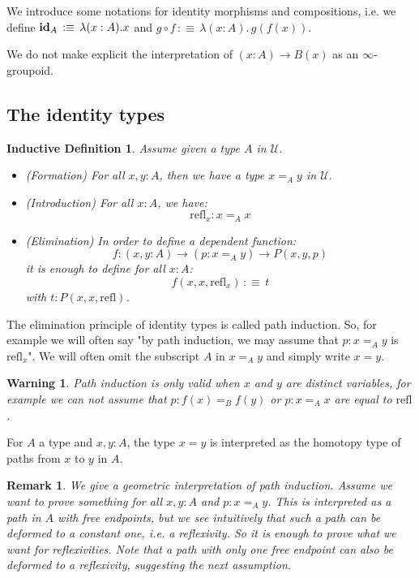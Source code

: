 \documentclass{article}
\newcommand{\sse}[1]{\medbreak \subsection{#1}}
\newcommand{\U}{{\mathcal U}}
\renewcommand{\r}{\rightarrow}
\newcommand{\Gl}{\lambda}
\newcommand{\refl}{\mathrm{refl}}
\newcommand{\id}{\mathrm{\bf id}}
\newtheorem{remark}{Remark}
\newtheorem{ind_def}{Inductive Definition}
\newtheorem{warning}{\danger Warning}
\begin{document}
We introduce some notations for identity morphisms and compositions, i.e. %
we define $\id_A \, :\equiv\, \Gl(x:A).x$ and $g\circ f\, :\equiv\, \Gl(x:A).\, g(f(x))$.

We do not make explicit the interpretation of $(x:A)\r B(x)$ as an $\infty$-groupoid.



\sse{The identity types}

\begin{ind_def}
Assume given a type $A$ in $\U$.%
\begin{itemize}
\item (Formation) For all $x,y:A$, then we have a type $x=_A y$ in $\U$.
\item (Introduction) For all $x:A$, we have:
\[\refl_x : x=_Ax\]
\item (Elimination) In order to define a dependent function: 
\[f : (x,y:A)\r (p:x=_Ay)\r P(x,y,p)\] 
it is enough to define for all $x:A$:
\[f(x,x,\refl_x)\,:\equiv\, t\]
with $t:P(x,x,\refl)$.

\end{itemize}
\end{ind_def}

The elimination principle of identity types is called path induction. So, for example we will often say "by path induction, we may assume that $p:x=_A y$ is $\refl_x$". We will often omit the subscript $A$ in $x=_Ay$ and simply write $x=y$. 

\begin{warning}
Path induction is only valid when $x$ and $y$ are distinct variables, for example we can not assume that $p:f(x)=_Bf(y)$ or $p:x=_Ax$ are equal to $\refl$.
\end{warning}

For $A$ a type and $x,y:A$, the type $x=y$ is interpreted as the homotopy type of paths from $x$ to $y$ in $A$.

\begin{remark}
We give a geometric interpretation of path induction. Assume we want to prove something for all $x,y:A$ and $p:x=_Ay$. This is interpreted as a path in $A$ with free endpoints, but we see intuitively that such a path can be deformed to a constant one, i.e. a reflexivity. So it is enough to prove what we want for reflexivities. Note that a path with only one free endpoint can also be deformed to a reflexivity, suggesting the next assumption.%
\end{remark}
\end{document}
